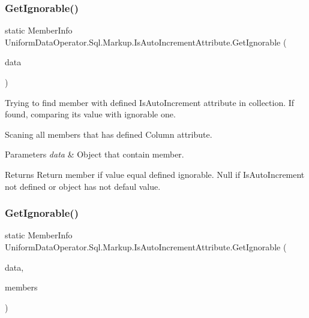 \subsubsection{\texorpdfstring{Get\+Ignorable()}{GetIgnorable()}\hspace{0.1cm}{\footnotesize\ttfamily [1/2]}}
{\footnotesize\ttfamily static Member\+Info Uniform\+Data\+Operator.\+Sql.\+Markup.\+Is\+Auto\+Increment\+Attribute.\+Get\+Ignorable (\begin{DoxyParamCaption}\item[{ref object}]{data }\end{DoxyParamCaption})\hspace{0.3cm}{\ttfamily [static]}}



Trying to find member with defined Is\+Auto\+Increment attribute in collection. If found, comparing it\textquotesingle{}s value with ignorable one. 

Scaning all members that has defined Column attribute. 


\begin{DoxyParams}{Parameters}
{\em data} & Object that contain member.\\
\hline
\end{DoxyParams}
\begin{DoxyReturn}{Returns}
Return member if value equal defined ignorable. Null if Is\+Auto\+Increment not defined or object has not defaul value.
\end{DoxyReturn}
\mbox{\label{class_uniform_data_operator_1_1_sql_1_1_markup_1_1_is_auto_increment_attribute_a01792b68658d2ad636c7d8684e0e5104}} 
\subsubsection{\texorpdfstring{Get\+Ignorable()}{GetIgnorable()}\hspace{0.1cm}{\footnotesize\ttfamily [2/2]}}
{\footnotesize\ttfamily static Member\+Info Uniform\+Data\+Operator.\+Sql.\+Markup.\+Is\+Auto\+Increment\+Attribute.\+Get\+Ignorable (\begin{DoxyParamCaption}\item[{ref object}]{data,  }\item[{I\+Enumerable$<$ Member\+Info $>$}]{members }\end{DoxyParamCaption})\hspace{0.3cm}{\ttfamily [static]}}



